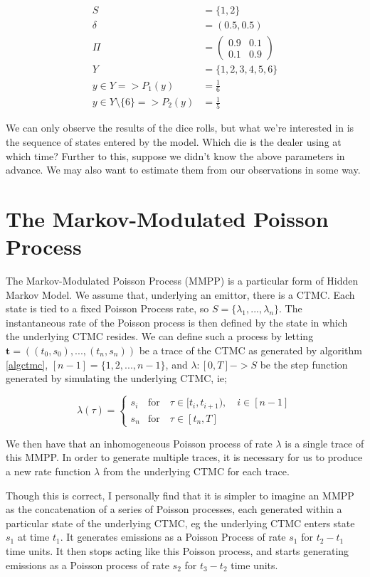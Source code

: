 \begin{align*}
S &= \{1,2\}\\
\delta &= (0.5,0.5)\\
\Pi &= 
\left(
	\begin{matrix}
	0.9 & 0.1 \\
	0.1 & 0.9
	\end{matrix}
\right)\\
Y &= \{1,2,3,4,5,6\}\\
y \in Y => P_1(y) &= \frac{1}{6}\\
y \in Y \setminus \{6\} => P_2(y) &= \frac{1}{5}
\end{align*}

We can only observe the results of the dice rolls, but what we're interested in is the sequence of states entered by the model. Which die is the dealer using at which time? Further to this, suppose we didn't know the above parameters in advance. We may also want to estimate them from our observations in some way.

\section{The Markov-Modulated Poisson Process}

The Markov-Modulated Poisson Process (MMPP) is a particular form of Hidden Markov Model. We assume that, underlying an emittor, there is a CTMC. Each state is tied to a fixed Poisson Process rate, so $S = \{\lambda_1,...,\lambda_n\}$. The instantaneous rate of the Poisson process is then defined by the state in which the underlying CTMC resides. We can define such a process by letting $\mathbf{t} = ((t_0,s_0),...,(t_n,s_n))$ be a trace of the CTMC as generated by algorithm \ref{algctmc}, $[n-1] = \{1,2,...,n-1\}$, and $\lambda : [0,T]->S$ be the step function generated by simulating the underlying CTMC, ie;

$$
\lambda(\tau) = 
\begin{cases}
	s_i & \mbox{for} \quad \tau \in [t_i,t_{i+1}), \quad i \in [n-1]\\
	s_n & \mbox{for} \quad \tau \in [t_n,T]
\end{cases}
$$

We then have that an inhomogeneous Poisson process of rate $\lambda$ is a single trace of this MMPP. In order to generate multiple traces, it is necessary for us to produce a new rate function $\lambda$ from the underlying CTMC for each trace.

Though this is correct, I personally find that it is simpler to imagine an MMPP as the concatenation of a series of Poisson processes, each generated within a particular state of the underlying CTMC, eg the underlying CTMC enters state $s_1$ at time $t_1$. It generates emissions as a Poisson Process of rate $s_1$ for $t_2-t_1$ time units. It then stops acting like this Poisson process, and starts generating emissions as a Poisson process of rate $s_2$ for $t_3-t_2$ time units.

